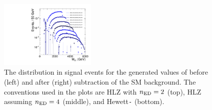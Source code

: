 \begin{figure}[tbp!]
	\includegraphics[angle=0,width=0.41\textwidth]{figures/ADDGravToGG_NED-2_KK-4_bkg_sub.pdf}
	\caption{The \Mgg distribution in signal events for the generated values of \Ms before (left) and after (right) subtraction of the SM background. The \KK conventions used in the plots are HLZ with $n_{\rm ED} = 2$ (top), HLZ assuming $n_{\rm ED} = 4$ (middle), and Hewett\texttt{-} (bottom).}
	\label{fig:signal}
\end{figure} 

